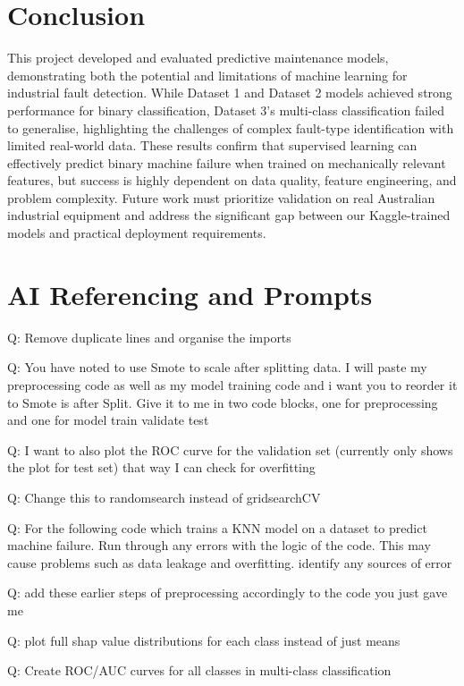 \documentclass[11pt]{article}
\begin{document}
\section {Conclusion}

This project developed and evaluated predictive maintenance models, demonstrating both the potential and limitations of machine learning for industrial fault detection. While Dataset 1 and Dataset 2 models achieved strong performance for binary classification, Dataset 3’s multi-class classification failed to generalise, highlighting the challenges of complex fault-type identification with limited real-world data. These results confirm that supervised learning can effectively predict binary machine failure when trained on mechanically relevant features, but success is highly dependent on data quality, feature engineering, and problem complexity. Future work must prioritize validation on real Australian industrial equipment and address the significant gap between our Kaggle-trained models and practical deployment requirements.

\newpage
\section{AI Referencing and Prompts}

Q: Remove duplicate lines and organise the imports

Q: You have noted to use Smote to scale after splitting data. I will paste my preprocessing code as well as my model training code and i want you to reorder it to Smote is after Split. Give it to me in two code blocks, one for preprocessing and one for model train validate test

Q: I want to also plot the ROC curve for the validation set (currently only shows the plot for test set) that way I can check for overfitting

Q: Change this to randomsearch instead of gridsearchCV

Q: For the following code which trains a KNN model on a dataset to predict machine failure. Run through any errors with the logic of the code. This may cause problems such as data leakage and overfitting. identify any sources of error

Q: add these earlier steps of preprocessing accordingly to the code you just gave me

Q: plot full shap value distributions for each class instead of just means

Q: Create ROC/AUC curves for all classes in multi-class classification
\end{document}
